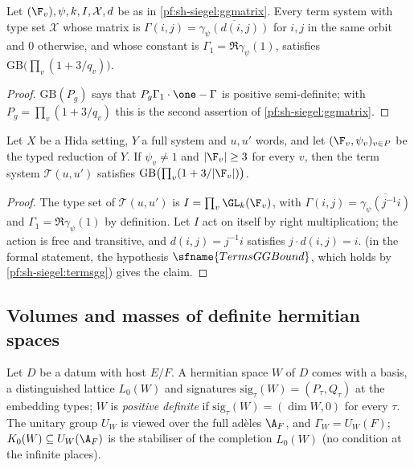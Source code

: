 \begin{corollary}\label{pf:sh-siegel:termsgg}
Let $(\F_v),\psi,k,I,\mathcal X,d$ be as in \cref{pf:sh-siegel:ggmatrix}. Every term system with type set $\mathcal X$ whose
matrix is $\Gamma(i,j)=\overline{\gamma_\psi(d(i,j))}$ for $i,j$ in the same orbit and $0$ otherwise, and whose constant is
$\Gamma_1=\Re\gamma_\psi(1)$, satisfies $\mathrm{GB}\bigl(\prod_v(1+3/q_v)\bigr)$.
\end{corollary}

\begin{proof}
$\mathrm{GB}(P_g)$ says that $P_g\Gamma_1\cdot\one-\Gamma$ is positive semi-definite; with $P_g=\prod_v(1+3/q_v)$ this is the
second assertion of \cref{pf:sh-siegel:ggmatrix}.
\end{proof}

\begin{proposition}\label{pf:sh-siegel:ggbound}
Let $X$ be a Hida setting, $Y$ a full system and $u,u'$ words, and let $(\F_v,\psi_v)_{v\in P}$ be the typed reduction of $Y$. If
$\psi_v\ne1$ and $|\F_v|\ge3$ for every $v$, then the term system $\mathcal T(u,u')$ satisfies
$\mathrm{GB}\bigl(\prod_v(1+3/|\F_v|)\bigr)$.
\end{proposition}

\begin{proof}
The type set of $\mathcal T(u,u')$ is $I=\prod_v\GL_k(\F_v)$, with $\Gamma(i,j)=\overline{\gamma_\psi(j^{-1}i)}$ and
$\Gamma_1=\Re\gamma_\psi(1)$ by definition. Let $I$ act on itself by right multiplication; the action is free and transitive,
and $d(i,j)=j^{-1}i$ satisfies $j\cdot d(i,j)=i$.  (in the formal statement, the hypothesis
$\sfname{TermsGGBound}$, which holds by \cref{pf:sh-siegel:termsgg}) gives the claim.
\end{proof}


\subsection{Volumes and masses of definite hermitian spaces}\label{sec:pf:sh-siegel:mass}

Let $D$ be a datum with host $E/F$. A hermitian space $W$ of $D$ comes with a basis, a distinguished lattice $L_0(W)$ and
signatures $\mathrm{sig}_\tau(W)=(P_\tau,Q_\tau)$ at the embedding types; $W$ is \emph{positive definite} if
$\mathrm{sig}_\tau(W)=(\dim W,0)$ for every $\tau$. The unitary group $U_W$ is viewed over the full ad\`eles $\A_F$, and
$\Gamma_W=U_W(F)$; $K_0(W)\subseteq U_W(\A_F)$ is the stabiliser of the completion $\widehat L_0(W)$ (no condition at the
infinite places).

